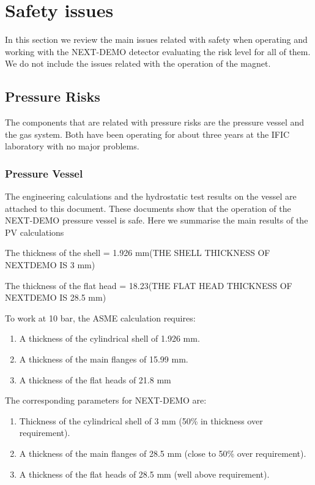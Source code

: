 \section{Safety issues}

In this section we review the main issues related with safety when operating and working with the NEXT-DEMO detector evaluating the risk level for all of them. We do not include the issues related with the operation of the magnet.

\subsection{Pressure Risks}

The components that are related with pressure risks are the pressure vessel and the gas system. Both have been operating for about three years at the IFIC laboratory with no major problems.

\subsubsection{Pressure Vessel}
The engineering calculations and the hydrostatic test results on the vessel are attached to this document. These documents show that the operation of the NEXT-DEMO pressure vessel is safe. Here we summarise the main results of the PV calculations

The thickness of the shell = 1.926 mm(THE SHELL THICKNESS OF NEXTDEMO IS
3 mm)

The thickness of the flat head = 18.23(THE FLAT HEAD THICKNESS OF NEXTDEMO IS 28.5 mm)

To work at 10 bar, the ASME calculation requires:
\begin{enumerate}
\item A thickness of the cylindrical shell of 1.926 mm.
\item A thickness of the main flanges of 15.99 mm.
\item A thickness of the flat heads of 21.8 mm
\end{enumerate}

The corresponding parameters for NEXT-DEMO are:
\begin{enumerate}
\item Thickness of the cylindrical shell of 3 mm (50\% in thickness over requirement).
\item A thickness of the main flanges of 28.5 mm (close to 50\% over requirement).
\item A thickness of the flat heads of 28.5 mm (well above requirement).
\end{enumerate}

